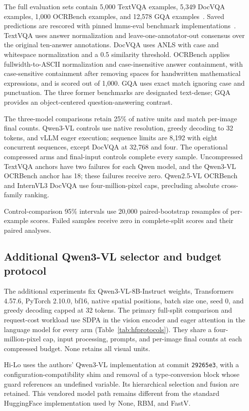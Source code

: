 \documentclass[10pt,twocolumn,letterpaper]{article}
\begin{document}
The full evaluation sets contain 5,000 TextVQA examples, 5,349 DocVQA examples, 1,000 OCRBench examples, and 12,578 GQA examples~\cite{singh2019textvqa,mathew2021docvqa,liu2024ocrbench,hudson2019gqa}. Saved predictions are rescored with pinned lmms-eval benchmark implementations~\cite{zhang2024lmmseval}. TextVQA uses answer normalization and leave-one-annotator-out consensus over the original ten-answer annotations. DocVQA uses ANLS with case and whitespace normalization and a 0.5 similarity threshold. OCRBench applies fullwidth-to-ASCII normalization and case-insensitive answer containment, with case-sensitive containment after removing spaces for handwritten mathematical expressions, and is scored out of 1,000. GQA uses exact match ignoring case and punctuation. The three former benchmarks are designated text-dense; GQA provides an object-centered question-answering contrast.

The three-model comparisons retain 25\% of native units and match per-image final counts. Qwen3-VL controls use native resolution, greedy decoding to 32 tokens, and vLLM eager execution; sequence limits are 8,192 with eight concurrent sequences, except DocVQA at 32,768 and four. The operational compressed arms and final-input controls complete every sample. Uncompressed TextVQA anchors have two failures for each Qwen model, and the Qwen3-VL OCRBench anchor has 18; these failures receive zero. Qwen2.5-VL OCRBench and InternVL3 DocVQA use four-million-pixel caps, precluding absolute cross-family ranking.

Control-comparison 95\% intervals use 20,000 paired-bootstrap resamples of per-example scores. Failed samples receive zero in complete-split scores and their paired analyses.

\subsection{Additional Qwen3-VL selector and budget protocol}
The additional experiments fix Qwen3-VL-8B-Instruct weights, Transformers 4.57.6, PyTorch 2.10.0, bf16, native spatial positions, batch size one, seed 0, and greedy decoding capped at 32 tokens. The primary full-split comparison and request-cost workload use SDPA in the vision encoder and eager attention in the language model for every arm (Table~\ref{tab:hfprotocols}). They share a four-million-pixel cap, input processing, prompts, and per-image final counts at each compressed budget. None retains all visual units.

Hi-Lo uses the authors' Qwen3-VL implementation at commit \texttt{29265e3}, with a configuration-compatibility shim and removal of a type-conversion block whose guard references an undefined variable. Its hierarchical selection and fusion are retained. This vendored model path remains different from the standard HuggingFace implementation used by None, RBM, and FastV.
\end{document}
